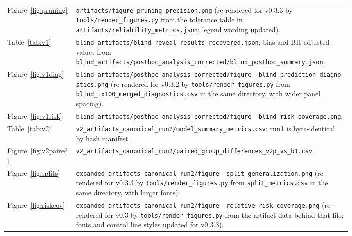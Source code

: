\documentclass[11pt,a4paper]{article}
\begin{document}
{\begin{longtable}{lp{0.80\linewidth}}
Figure~\ref{fig:pruning} & \texttt{artifacts/\allowbreak figure\_\allowbreak pruning\_\allowbreak precision.png} (re-rendered for v0.3.3 by \texttt{tools/\allowbreak render\_\allowbreak figures.py} from the tolerance table in \texttt{artifacts/\allowbreak reliability\_\allowbreak metrics.json}; legend wording updated). \\
Table~\ref{tab:v1} & \texttt{blind\_\allowbreak artifacts/\allowbreak blind\_\allowbreak reveal\_\allowbreak results\_\allowbreak recovered.json}; bias and BH-adjusted values from \texttt{blind\_\allowbreak artifacts/\allowbreak posthoc\_\allowbreak analysis\_\allowbreak corrected/\allowbreak blind\_\allowbreak posthoc\_\allowbreak summary.json}. \\
Figure~\ref{fig:v1diag} & \texttt{blind\_\allowbreak artifacts/\allowbreak posthoc\_\allowbreak analysis\_\allowbreak corrected/\allowbreak figure\_\allowbreak 1\_\allowbreak blind\_\allowbreak prediction\_\allowbreak diagnostics.png} (re-rendered for v0.3.2 by \texttt{tools/\allowbreak render\_\allowbreak figures.py} from \texttt{blind\_\allowbreak tx100\_\allowbreak merged\_\allowbreak diagnostics.csv} in the same directory, with wider panel spacing). \\
Figure~\ref{fig:v1risk} & \texttt{blind\_\allowbreak artifacts/\allowbreak posthoc\_\allowbreak analysis\_\allowbreak corrected/\allowbreak figure\_\allowbreak 2\_\allowbreak blind\_\allowbreak risk\_\allowbreak coverage.png}. \\
Table~\ref{tab:v2} & \texttt{v2\_\allowbreak artifacts\_\allowbreak canonical\_\allowbreak run2/\allowbreak model\_\allowbreak summary\_\allowbreak metrics.csv}; run1 is byte-identical by hash manifest. \\
Figure~\ref{fig:v2paired} & \texttt{v2\_\allowbreak artifacts\_\allowbreak canonical\_\allowbreak run2/\allowbreak paired\_\allowbreak group\_\allowbreak differences\_\allowbreak v2p\_\allowbreak vs\_\allowbreak b1.csv}. \\
Figure~\ref{fig:splits} & \texttt{expanded\_\allowbreak artifacts\_\allowbreak canonical\_\allowbreak run2/\allowbreak figure\_\allowbreak 1\_\allowbreak split\_\allowbreak generalization.png} (re-rendered for v0.3.3 by \texttt{tools/\allowbreak render\_\allowbreak figures.py} from \texttt{split\_\allowbreak metrics.csv} in the same directory, with larger fonts). \\
Figure~\ref{fig:riskcov} & \texttt{expanded\_\allowbreak artifacts\_\allowbreak canonical\_\allowbreak run2/\allowbreak figure\_\allowbreak 3\_\allowbreak relative\_\allowbreak risk\_\allowbreak coverage.png} (re-rendered for v0.3 by \texttt{tools/\allowbreak render\_\allowbreak figures.py} from the artifact data behind that file; fonts and control line styles updated for v0.3.3). \\

\end{longtable}}
\end{document}
